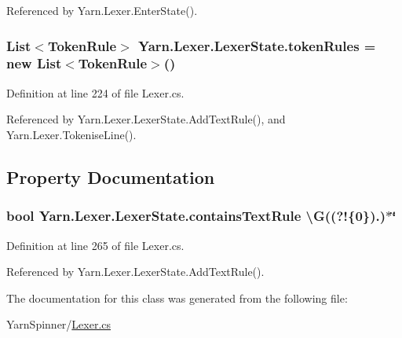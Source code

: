Referenced by Yarn.\-Lexer.\-Enter\-State().

\hypertarget{a00118_adf6563b1dc6f3ef80ed13c2b15b7be03}{
\subsubsection[{token\-Rules}]{\setlength{\rightskip}{0pt plus 5cm}List$<${\bf Token\-Rule}$>$ Yarn.\-Lexer.\-Lexer\-State.\-token\-Rules = new List$<${\bf Token\-Rule}$>$()}}\label{a00118_adf6563b1dc6f3ef80ed13c2b15b7be03}


Definition at line 224 of file Lexer.\-cs.



Referenced by Yarn.\-Lexer.\-Lexer\-State.\-Add\-Text\-Rule(), and Yarn.\-Lexer.\-Tokenise\-Line().



\subsection{Property Documentation}
\hypertarget{a00118_a69948f05c35eeae9cb8448c849a053e6}{
\subsubsection[{contains\-Text\-Rule}]{\setlength{\rightskip}{0pt plus 5cm}bool Yarn.\-Lexer.\-Lexer\-State.\-contains\-Text\-Rule \textbackslash{}G((?!\{0\}).)$\ast$\char`\"{}\hspace{0.3cm}{\ttfamily [get]}}}\label{a00118_a69948f05c35eeae9cb8448c849a053e6}


Definition at line 265 of file Lexer.\-cs.



Referenced by Yarn.\-Lexer.\-Lexer\-State.\-Add\-Text\-Rule().



The documentation for this class was generated from the following file\-:\begin{DoxyCompactItemize}
\item 
Yarn\-Spinner/\hyperlink{a00292}{Lexer.\-cs}\end{DoxyCompactItemize}
